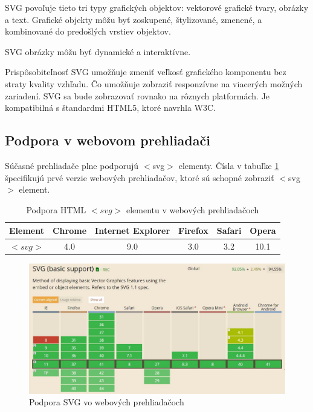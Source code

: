  SVG povoľuje tieto tri typy grafických objektov: vektorové grafické tvary, obrázky a text. 
Grafické objekty môžu byť zoskupené, štylizované, zmenené, a kombinované do predošlých vrstiev objektov. 

SVG obrázky môžu byť dynamické a interaktívne.

Prispôsobiteľnosť SVG umožňuje zmeniť veľkosť grafického komponentu bez straty kvality vzhľadu. Čo umožňuje zobraziť responzívne na viacerých možných zariadení. 
SVG sa bude zobrazovať rovnako na rôznych platformách. Je kompatibilná s štandardmi \acs{HTML}5, ktoré navrhla \ac*{W3C}. 


 \subsection{Podpora v webovom prehliadači}
 Súčasné prehliadače plne podporujú $<$svg$>$ elementy.  
  Čísla v tabuľke \ref{svgpreh} špecifikujú prvé verzie webových prehliadačov, ktoré sú schopné zobraziť $<$svg$>$ element.\cite{w3svg}
  
\begin{table}[hp]
\begin{center}
		\begin{tabular}{|c|c|c|c|c|c|}
		\hline \textbf{Element} & \textbf{Chrome} & \textbf{Internet} \textbf{Explorer}  & \textbf{Firefox}  & \textbf{Safari} & \textbf{Opera}  \\ 
		\hline $<svg>$ & 4.0& 9.0 & 3.0 & 3.2  &   10.1 \\ 
		\hline 
	\end{tabular} 
\end{center}
	
	\caption{Podpora HTML $<svg>$ elementu v webových prehliadačoch}
	\label{svgpreh}
\end{table}
 
 \begin{figure}
\centering
\includegraphics[width=0.7\linewidth]{obrazky/podpora}
\caption{Podpora SVG vo webových prehliadačoch}
\label{fig:podpora}
\end{figure}
 
